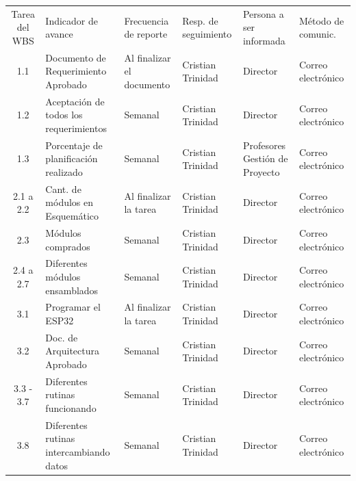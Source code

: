 \documentclass[11pt]{charter}
\begin{document}
\begin{table}[!htpb]
\centering
\begin{tabularx}{\linewidth}{@{}|c|X|X|X|X|X|@{}}
\hline
\rowcolor[HTML]{C0C0C0} 
\multicolumn{6}{|c|}{\cellcolor[HTML]{C0C0C0}SEGUIMIENTO DE AVANCE}                                                                       \\ \hline
\rowcolor[HTML]{C0C0C0} 
Tarea del WBS & Indicador de avance & Frecuencia de reporte & Resp. de seguimiento & Persona a ser informada & Método de comunic. \\ \hline
1.1 & Documento de Requerimiento Aprobado & Al finalizar el documento & Cristian \newline Trinidad & Director & Correo electrónico \\ \hline
1.2 & Aceptación de todos los requerimientos & Semanal & Cristian \newline Trinidad & Director & Correo electrónico \\ \hline
1.3 & Porcentaje de planificación realizado & Semanal & Cristian \newline Trinidad & Profesores Gestión de Proyecto & Correo electrónico \\ \hline
2.1 a 2.2 & Cant. de módulos en Esquemático & Al finalizar la tarea & Cristian \newline Trinidad & Director & Correo electrónico \\ \hline
2.3 & Módulos comprados & Semanal & Cristian \newline Trinidad & Director & Correo electrónico \\ \hline
2.4 a 2.7 & Diferentes módulos ensamblados & Semanal & Cristian \newline Trinidad & Director & Correo electrónico \\ \hline
3.1 & Programar el ESP32 & Al finalizar la tarea & Cristian \newline Trinidad & Director & Correo electrónico \\ \hline
3.2 & Doc. de Arquitectura Aprobado & Semanal & Cristian \newline Trinidad & Director & Correo electrónico \\ \hline
3.3 - 3.7 & Diferentes rutinas funcionando & Semanal & Cristian \newline Trinidad & Director & Correo electrónico \\ \hline
3.8 & Diferentes rutinas intercambiando datos & Semanal & Cristian \newline Trinidad & Director & Correo electrónico \\ \hline

\end{tabularx}
\end{table}
\end{document}
